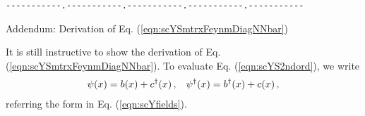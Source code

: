 \verb/-----------.-----------.-----------.-----------.-----------/\\
\vspace{-3mm}
{\small
\begin{center}
Addendum: Derivation of Eq. (\ref{eqn:scYSmtrxFeynmDiagNNbar})
\end{center}

It is still instructive to show the derivation of Eq. (\ref{eqn:scYSmtrxFeynmDiagNNbar}).
To evaluate Eq. (\ref{eqn:scYS2ndord}), we write
\begin{eqnarray}
\psi(x) = b(x) + c^\dagger(x)\,,
\hspace{3mm}
\psi^\dagger(x) = b^\dagger(x) + c(x)\,,
\end{eqnarray}
referring the form in Eq. (\ref{eqn:scYfields}).

\bigskip


}
